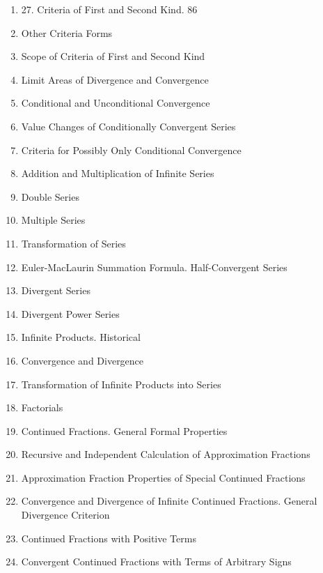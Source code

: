 \begin{enumerate}[itemsep=0pt]
    \item 27. Criteria of First and Second Kind. 86
    \setcounter{enumi}{27}
    \item Other Criteria Forms
    \item Scope of Criteria of First and Second Kind
    \item Limit Areas of Divergence and Convergence
    \item Conditional and Unconditional Convergence
    \item Value Changes of Conditionally Convergent Series
    \item Criteria for Possibly Only Conditional Convergence
    \item Addition and Multiplication of Infinite Series
    \item Double Series
    \item Multiple Series
    \item Transformation of Series
    \item Euler-MacLaurin Summation Formula. Half-Convergent Series
    \item Divergent Series
    \item Divergent Power Series
    \item Infinite Products. Historical
    \item Convergence and Divergence
    \item Transformation of Infinite Products into Series
    \item Factorials
    \item Continued Fractions. General Formal Properties
    \item Recursive and Independent Calculation of Approximation Fractions
    \item Approximation Fraction Properties of Special Continued Fractions
    \item Convergence and Divergence of Infinite Continued Fractions. General Divergence Criterion
    \item Continued Fractions with Positive Terms
    \item Convergent Continued Fractions with Terms of Arbitrary Signs
\end{enumerate}

